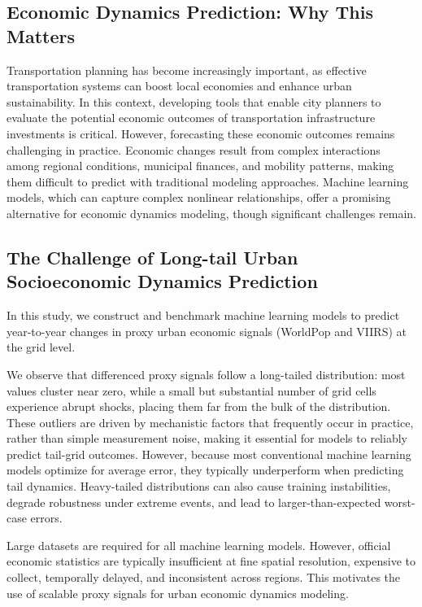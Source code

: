 \documentclass[11pt,conference,onecolumn]{IEEEtran}
\begin{document}
\subsection{Economic Dynamics Prediction: Why This Matters}
Transportation planning has become increasingly important, as effective transportation systems can boost local economies and enhance urban sustainability. In this context, developing tools that enable city planners to evaluate the potential economic outcomes of transportation infrastructure investments is critical. However, forecasting these economic outcomes remains challenging in practice. Economic changes result from complex interactions among regional conditions, municipal finances, and mobility patterns, making them difficult to predict with traditional modeling approaches. Machine learning models, which can capture complex nonlinear relationships, offer a promising alternative for economic dynamics modeling, though significant challenges remain.

\subsection{The Challenge of Long-tail Urban Socioeconomic Dynamics Prediction}

In this study, we construct and benchmark machine learning models to predict year-to-year changes in proxy urban economic signals (WorldPop and VIIRS) at the grid level.

We observe that differenced proxy signals follow a long-tailed distribution: most values cluster near zero, while a small but substantial number of grid cells experience abrupt shocks, placing them far from the bulk of the distribution. These outliers are driven by mechanistic factors that frequently occur in practice, rather than simple measurement noise, making it essential for models to reliably predict tail-grid outcomes. However, because most conventional machine learning models optimize for average error, they typically underperform when predicting tail dynamics. Heavy-tailed distributions can also cause training instabilities, degrade robustness under extreme events, and lead to larger-than-expected worst-case errors.

Large datasets are required for all machine learning models. However, official economic statistics are typically insufficient at fine spatial resolution, expensive to collect, temporally delayed, and inconsistent across regions. This motivates the use of scalable proxy signals for urban economic dynamics modeling.
\end{document}
